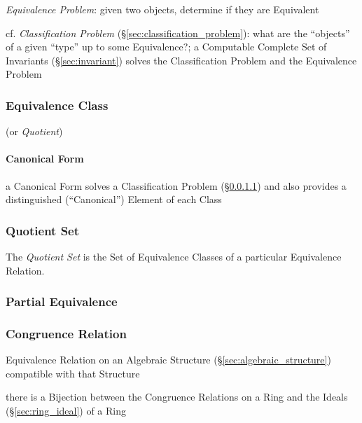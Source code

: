 \emph{Equivalence Problem}: given two objects, determine if they are Equivalent

\fist cf. \emph{Classification Problem} (\S\ref{sec:classification_problem}):
what are the ``objects'' of a given ``type'' up to some Equivalence?; a
Computable Complete Set of Invariants (\S\ref{sec:invariant}) solves the
Classification Problem and the Equivalence Problem



\subsubsection{Equivalence Class}\label{sec:equivalence_class}

(or \emph{Quotient})



\paragraph{Canonical Form}\label{sec:canonical_form}\hfill

a Canonical Form solves a Classification Problem (\S\ref{sec:canonical_form})
and also provides a distinguished (``Canonical'') Element of each Class



\subsubsection{Quotient Set}\label{sec:quotient_set}

The \emph{Quotient Set} is the Set of Equivalence Classes of a
particular Equivalence Relation.



\subsubsection{Partial Equivalence}\label{sec:partial_equivalence}

\subsubsection{Congruence Relation}\label{sec:congruence_relation}

Equivalence Relation on an Algebraic Structure
(\S\ref{sec:algebraic_structure}) compatible with that Structure

there is a Bijection between the Congruence Relations on a Ring and the Ideals
(\S\ref{sec:ring_ideal}) of a Ring



